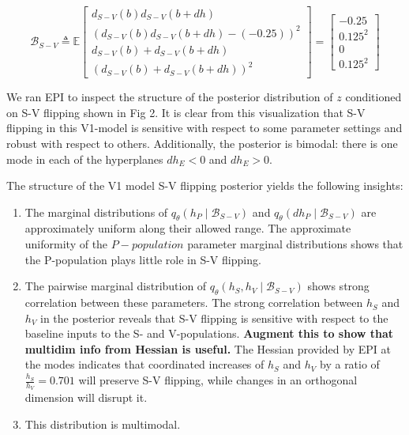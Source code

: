 \documentclass[11pt]{article}
\begin{document}
\begin{equation}
\mathcal{B}_{S-V} \triangleq \mathbb{E}\begin{bmatrix} d_{S-V}(b)d_{S-V}(b+dh) \\ \left( d_{S-V}(b)d_{S-V}(b+dh) - (-0.25) \right)^2 \\  d_{S-V}(b) + d_{S-V}(b+dh) \\  \left( d_{S-V}(b) + d_{S-V}(b+dh)\right)^2 \end{bmatrix} = 
\begin{bmatrix} -0.25 \\ 0.125^2 \\ 0 \\ 0.125^2 \end{bmatrix}
\end{equation}

We ran EPI to inspect the structure of the posterior distribution of $z$ conditioned on S-V flipping shown in Fig 2.  
It is clear from this visualization that S-V flipping in this V1-model is sensitive with respect to some parameter settings and robust with respect to others.
Additionally, the posterior is bimodal: there is one mode in each of the hyperplanes $dh_E < 0$ and $dh_E > 0$.

The structure of the V1 model S-V flipping posterior yields the following insights:
\begin{enumerate}
\item The marginal distributions of $q_\theta(h_P \mid \mathcal{B}_{S-V})$ and  $q_\theta(dh_P \mid \mathcal{B}_{S-V})$ are approximately uniform along their allowed range.  
The approximate uniformity of the $P-population$ parameter marginal distributions shows that the P-population plays little role in S-V flipping. 
\item The pairwise marginal distribution of $q_\theta(h_S, h_V \mid \mathcal{B}_{S-V})$ shows strong correlation between these parameters.
The strong correlation between $h_S$ and $h_V$ in the posterior reveals that S-V flipping is sensitive with respect to the baseline inputs to the S- and V-populations.
\textbf{Augment this to show that multidim info from Hessian is useful.}
The Hessian provided by EPI at the modes indicates that coordinated increases of $h_S$ and $h_V$ by a ratio of $\frac{h_S}{h_V} = 0.701$ will preserve S-V flipping, while changes in an orthogonal dimension will disrupt it.

\item This distribution is multimodal.
\end{enumerate}
\end{document}
